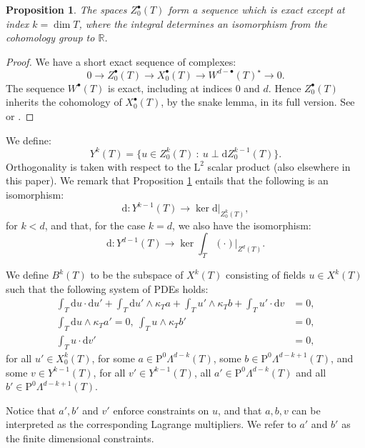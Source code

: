 \documentclass[10pt,a4paper]{article}
\newcommand{\rmd}{\mathrm{d}}
\newcommand{\rmL}{\mathrm{L}}
\newcommand{\rmP}{\mathrm{P}}
\newcommand{\bbR}{\mathbb{R}}
\newcommand{\bs}{{\scriptscriptstyle{\bullet}}}
\newcommand{\ts}{\textstyle}
\newtheorem{proposition}[theorem]{Proposition}
\theoremstyle{remark}
\theoremstyle{definition}
\numberwithin{equation}{section}
\begin{document}
\begin{proposition}\label{prop:zexact}
  The spaces $Z^\bs_0(T)$ form a sequence which is exact except at index $k=\dim T$, where the integral determines an isomorphism from the cohomology group to $\bbR$.
\end{proposition}
\begin{proof}
  We have a short exact sequence of complexes:
\begin{equation}
  0 \to Z^\bs_0(T) \to X^\bs_0(T) \to W^{d-\bs}(T)^\star \to 0.
\end{equation}
The sequence $W^\bs(T)$ is exact, including at indices $0$ and $d$. Hence $Z^\bs_0(T)$ inherits the cohomology of $X^\bs_0(T)$, by the snake lemma, in its full version. See \cite[Theorem 3.5, p. 600]{Alu09} or \cite[Theorem 3.1, p. 356]{Chr09AWM}.
\end{proof}


We define:
\begin{equation}
  Y^k(T) = \{ u \in Z^k_0(T) \ : \ u \perp \rmd Z^{k-1}_0(T) \}.
\end{equation}
Orthogonality is taken with respect to the $\rmL^2$ scalar product (also elsewhere in this paper).
We remark that Proposition \ref{prop:zexact} entails that the following is an isomorphism:
\begin{equation}
\rmd: Y^{k-1}(T) \to \ker \rmd |_{Z^{k}_0(T)},
\end{equation}
for $k < d$, and that, for the case $k =d$, we also have the isomorphism:
\begin{equation}
\rmd: Y^{d-1}(T) \to \ker \ts \int_T(\cdot) |_{Z^{d}(T)}.
\end{equation}


We define $B^k(T)$ to be the subspace of $X^k(T)$ consisting of fields $u \in X^k(T)$ such that the following system of PDEs holds:
\begin{align}
  \int_T \rmd u \cdot \rmd u' + \int_T \rmd u' \wedge \kappa_T a + \int_T u' \wedge \kappa_T b + \int_T u' \cdot \rmd v & = 0,\\
  \int_T \rmd u \wedge \kappa_T a' =0 ,\ \int_T u \wedge \kappa_T b' & = 0 ,\\
  \int_T u \cdot \rmd v' & = 0,
\end{align}
for all $u' \in X^k_0(T)$, for some $a \in \rmP^0\Lambda^{d-k}(T)$, some $b \in \rmP^0\Lambda^{d-k +1}(T)$, and some $v \in Y^{k-1}(T)$,  for all $v' \in Y^{k-1}(T)$, all $a' \in \rmP^0\Lambda^{d-k}(T)$ and all $b' \in \rmP^0\Lambda^{d-k +1}(T)$. 

Notice that $a', b'$ and $v'$ enforce constraints on $u$, and that $a, b, v$ can be interpreted as the corresponding Lagrange multipliers. We refer to $a'$ and $b'$ as the finite dimensional constraints.
\end{document}
